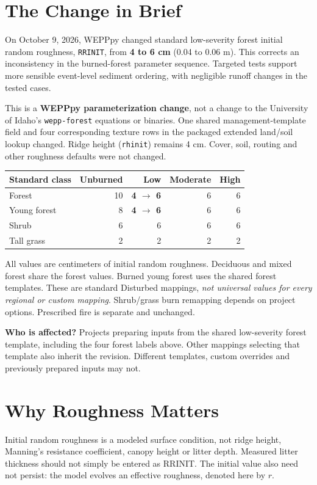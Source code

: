 \section{The Change in Brief}
On October 9, 2026, WEPPpy changed standard low-severity forest initial random
roughness, \texttt{RRINIT}, from \textbf{4 to 6 cm} (0.04 to 0.06 m).
This corrects an inconsistency in the burned-forest parameter sequence.
Targeted tests support more sensible event-level sediment ordering, with
negligible runoff changes in the tested cases.\cite{adr}

This is a \textbf{WEPPpy parameterization change}, not a change to the
University of Idaho's \texttt{wepp-forest} equations or binaries. One shared
management-template field and four corresponding texture rows in the packaged
extended land/soil lookup changed. Ridge height (\texttt{rhinit}) remains
4 cm. Cover, soil, routing and other roughness defaults were not changed.

\begin{center}
\begin{tabular}{lrrrr}
\toprule
Standard class & Unburned & Low & Moderate & High\\
\midrule
Forest & 10 & \textbf{4 $\to$ 6} & 6 & 6\\
Young forest & 8 & \textbf{4 $\to$ 6} & 6 & 6\\
Shrub & 6 & 6 & 6 & 6\\
Tall grass & 2 & 2 & 2 & 2\\
\bottomrule
\end{tabular}
\end{center}
All values are centimeters of initial random roughness. Deciduous and mixed
forest share the forest values. Burned young forest uses the shared forest
templates. These are standard Disturbed mappings, \emph{not universal values
for every regional or custom mapping}. Shrub/grass burn remapping depends on
project options. Prescribed fire is separate and unchanged.

\textbf{Who is affected?} Projects preparing inputs from the shared low-severity
forest template, including the four forest labels above. Other mappings
selecting that template also inherit the revision. Different templates, custom
overrides and previously prepared inputs may not.

\clearpage
\section{Why Roughness Matters}
Initial random roughness is a modeled surface condition, not ridge height,
Manning's resistance coefficient, canopy height or litter depth. Measured litter
thickness should not simply be entered as RRINIT. The initial value also need
not persist: the model evolves an effective roughness, denoted here by $r$.

